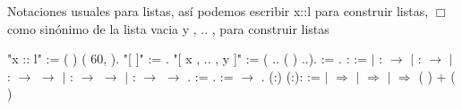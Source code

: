 \documentclass[12pt]{report}
\begin{document}
Notaciones usuales para listas, así podemos escribir x::l para construir listas, \ensuremath{\Box} como sinónimo de la lista vacia y , .. ,  para construir listas \begin{coqdoccode}
\coqdocemptyline
\coqdocnoindent
{} "x :: l" := (  ) (  60,  ).\coqdoceol
\coqdocnoindent
{} "[ ]" := .\coqdoceol
\coqdocnoindent
{} "[ x , .. , y ]" := (  .. (  ) ..).\coqdoceol
\coqdocemptyline
\coqdocemptyline
\coqdocnoindent
{}  := .\coqdoceol
\coqdocemptyline
\coqdocemptyline
\coqdocnoindent
{}  :  :=\coqdoceol
\coqdocnoindent
\ensuremath{|}  :  \ensuremath{\rightarrow} \coqdoceol
\coqdocnoindent
\ensuremath{|}  :  \ensuremath{\rightarrow} \coqdoceol
\coqdocnoindent
\ensuremath{|}  :  \ensuremath{\rightarrow}  \ensuremath{\rightarrow} \coqdoceol
\coqdocnoindent
\ensuremath{|}  :  \ensuremath{\rightarrow}  \ensuremath{\rightarrow} \coqdoceol
\coqdocnoindent
\ensuremath{|}  :  \ensuremath{\rightarrow}  \ensuremath{\rightarrow} .\coqdoceol
\coqdocemptyline
\coqdocemptyline
\coqdocnoindent
{}  := .\coqdoceol
\coqdocemptyline
\coqdocemptyline
\coqdocnoindent
{}  :=  \ensuremath{\rightarrow} .\coqdoceol
\coqdocemptyline
\coqdocemptyline
\coqdocnoindent
{}  (:) (:): :=\coqdoceol
\coqdocnoindent
{}  \coqdoceol
\coqdocnoindent
\ensuremath{|}   \ensuremath{\Rightarrow}   \coqdoceol
\coqdocnoindent
\ensuremath{|}   \ensuremath{\Rightarrow}  \coqdoceol
\coqdocnoindent
\ensuremath{|}    \ensuremath{\Rightarrow} (  ) + (  )\coqdoceol

\end{coqdoccode}
\end{document}
